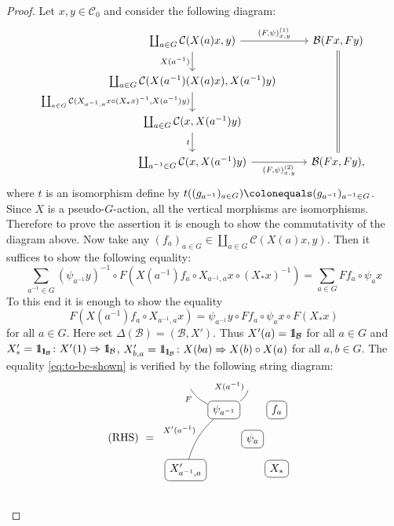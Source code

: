 \documentclass{surv-l}
\numberwithin{equation}{chapter}
\numberwithin{figure}{chapter}
\theoremstyle{plain}
\theoremstyle{definition}
\theoremstyle{remark}
\newcommand{\id}{1\kern-.25em{\text{{\rm l}}}}
\newcommand{\Ar}[3]{\ar[from={#1}, to={#2}, #3]}
\newcommand{\RN}{\node[rounded corners, draw]}
\newcommand{\RB}[3]{\ar[from={#1}, to={#2}, dash, bend right=15, #3]}
\newcommand{\LB}[3]{\ar[from={#1}, to={#2}, dash, bend left=15, #3]}
\newcommand{\Nname}[1]{|[alias=#1]|}
\begin{document}
\begin{proof}
Let $x,y\in{\mathcal{C}}_0$ and consider the following diagram:
\[
\begin{tikzcd}
\coprod_{a\in G}{\mathcal{C}}(X(a)x, y) & \mathcal{B}(Fx, Fy)\\
\coprod_{a\in G}{\mathcal{C}}(X(a^{-1})(X(a)x), X(a^{-1})y)\\
\coprod_{a\in G}{\mathcal{C}}(x, X(a^{-1})y)\\
\coprod_{a^{-1}\in G}{\mathcal{C}}(x, X(a^{-1})y) &  \mathcal{B}(Fx, Fy),
\Ar{1-1}{1-2}{"{(F,\psi)^{(1)}_{x,y}}"}
\Ar{4-1}{4-2}{"{(F,\psi)^{(2)}_{x,y}}" '}
\Ar{1-1}{2-1}{"X(a^{-1})" '}
\Ar{2-1}{3-1}{"{\coprod_{a\in G}{\mathcal{C}}(X_{a^{-1},a}x \circ (X_*x)^{-1}, X(a^{-1})y)}" '}
\Ar{3-1}{4-1}{"t" '}
\Ar{1-2}{4-2}{equal}
\end{tikzcd}
\]
where $t$ is an isomorphism define by $t((g_{a^{-1}})_{a\in G})\colonequals  (g_{a^{-1}})_{a^{-1} \in G}$.
Since $X$ is a pseudo-$G$-action,
all the vertical morphisms are isomorphisms.
Therefore to prove the assertion it is enough to show the commutativity of the diagram above.
Now take any $(f_a)_{a\in G} \in \coprod_{a\in G}{\mathcal{C}}(X(a)x, y)$.
Then it suffices to show the following equality:
\[
\sum_{a^{-1}\in G}(\psi_{a^{-1}}y)^{-1} \circ F(X(a^{-1})f_a \circ X_{a^{-1},a}x \circ (X_*x)^{-1})
= \sum_{a\in G} Ff_a \circ \psi_ax
\]
To this end it is enough to show the equality
\begin{equation}\label{eq:to-be-shown}
F(X(a^{-1})f_a \circ X_{a^{-1},a}x)
= \psi_{a^{-1}}y \circ Ff_a \circ \psi_ax \circ F(X_*x)
\end{equation}
for all $a\in G$.
Here set $\Delta(\mathcal{B}) = (\mathcal{B}, X')$.
Thus $X'(a) = \id_\mathcal{B}$ for all  $a \in G$ and
$X'_* = \id_{\id_\mathcal{B}} \colon X'(1) \Rightarrow \id_\mathcal{B}$,
$X'_{b,a} = \id_{\id_\mathcal{B}} \colon X(ba) \Rightarrow X(b) \circ X(a)$
for all $a, b \in G$.
The equality \eqref{eq:to-be-shown} is verified by the following string diagram:
\[
\text{(RHS)}\ =\  \begin{tikzcd}[row sep=1em, column sep=0.1em]
\Nname{up1}&&\Nname{up2}&\Nname{up3}&\\
&\RN(mid1){\psi_{a^{-1}}};&&\RN(mid2){f_a};&\\
&&\RN(mid3){\psi_a};&&\\
\RN(mid4){X'_{a^{-1},a}};&&&\RN(mid5){X_*};&\\
\Nname{down1}&&\Nname{down2}&\Nname{down3}&\Nname{down4}
\LB{mid1}{up1}{"F" near end}
\RB{mid1}{up2}{"X(a^{-1})"  near end}
\RB{mid1}{mid4}{"X'(a^{-1})" '}

\end{tikzcd}\]
\end{proof}
\end{document}
